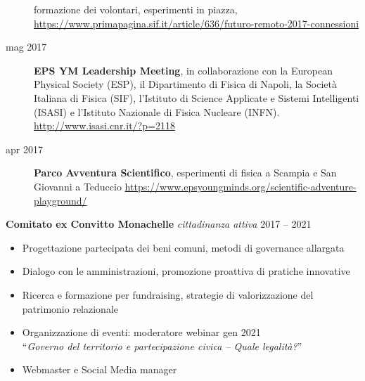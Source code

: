\documentclass[a4paper]{article}
\begin{document}
\begin{addmargin}[2em]{0em}
\begin{description}
        formazione dei volontari, esperimenti in piazza,
        \url{https://www.primapagina.sif.it/article/636/futuro-remoto-2017-connessioni}
  \item[mag 2017] \textbf{EPS YM Leadership Meeting},
        in collaborazione con la European Physical Society (ESP),
        il Dipartimento di Fisica di Napoli,
        la Società Italiana di Fisica (SIF),
        l’Istituto di Science Applicate e Sistemi Intelligenti (ISASI)
        e l’Istituto Nazionale di Fisica Nucleare (INFN).
        \url{http://www.isasi.cnr.it/?p=2118}
  \item [apr 2017] \textbf{Parco Avventura Scientifico},
        esperimenti di fisica a Scampia e San Giovanni a Teduccio
        \url{https://www.epsyoungminds.org/scientific-adventure-playground/}
\end{description}
\end{addmargin}

\vspace*{2mm}
\textbf{Comitato ex Convitto Monachelle}
{\sl cittadinanza attiva} \hfill 2017 -- 2021\\
\begin{itemize} \itemsep 1pt
  \item Progettazione partecipata dei beni comuni, metodi di governance allargata
  \item Dialogo con le amministrazioni, promozione proattiva di pratiche innovative
  \item Ricerca e formazione per fundraising, strategie di valorizzazione del patrimonio relazionale
  \item Organizzazione di eventi:
        moderatore webinar gen 2021 \\
        ``\textit{Governo del territorio e partecipazione civica – Quale legalità?}''
  \item Webmaster e Social Media manager
\end{itemize}
\end{document}
